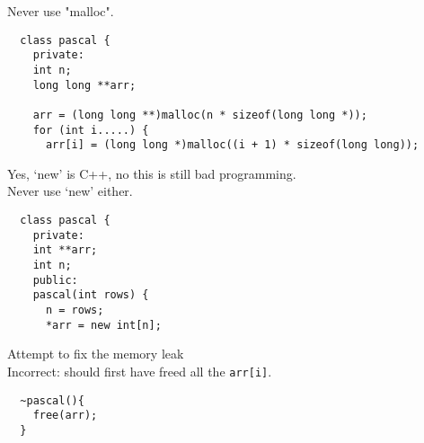 Never use "malloc".

\begin{lstlisting}
  class pascal {
    private:
    int n;
    long long **arr; 

    arr = (long long **)malloc(n * sizeof(long long *));
    for (int i.....) {
      arr[i] = (long long *)malloc((i + 1) * sizeof(long long));
\end{lstlisting}


Yes, `new' is C++, no this is still bad programming.\\
Never use `new' either.

\begin{lstlisting}
  class pascal {
    private:
    int **arr;
    int n;
    public:
    pascal(int rows) {
      n = rows;
      *arr = new int[n];
\end{lstlisting}


Attempt to fix the memory leak\\
Incorrect: should first have freed all the \lstinline+arr[i]+.

\begin{lstlisting}
  ~pascal(){
    free(arr);
  }
\end{lstlisting}

